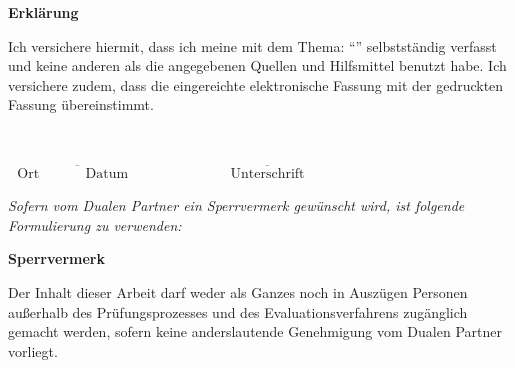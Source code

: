 

\newpage

\thispagestyle{empty}
\begin{framed}
\newcommand{\textoverline}[1]{$\overline{\mbox{#1}}$}

\begin{center}
\Large\bfseries Erklärung
\end{center}
\medskip
\noindent
Ich versichere hiermit, dass ich meine \Was{} mit dem Thema:
\enquote{\Titel}
selbstständig verfasst und keine anderen als die angegebenen Quellen und Hilfsmittel benutzt habe. Ich versichere zudem, dass die eingereichte elektronische Fassung mit der gedruckten Fassung übereinstimmt.

\bigskip
~
\bigskip

\textoverline{~~Ort~~~~~~~~~~Datum~~~~}\hfill \textoverline{~~~~~~~~~~~~~~~~~~Unterschrift~~~~~~~~~~~~~~~~~~}
\end{framed}

\vfill
\emph{Sofern  vom Dualen Partner ein Sperrvermerk gewünscht wird, ist folgende Formulierung
zu verwenden:}
\begin{framed}
\begin{center}
\Large\bfseries Sperrvermerk
\end{center}
\medskip
\noindent
Der Inhalt dieser Arbeit darf weder als Ganzes noch in Auszügen Personen
außerhalb des Prüfungsprozesses und des Evaluationsverfahrens zugänglich gemacht
werden, sofern keine anderslautende Genehmigung vom Dualen Partner vorliegt.
\end{framed}

\endinput
